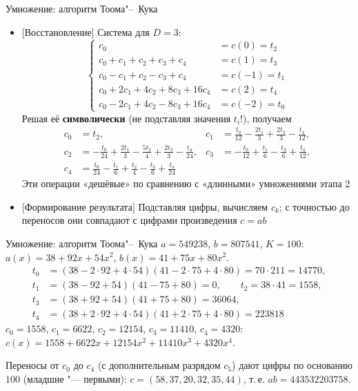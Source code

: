 \documentclass{ca-slides}
\begin{document}
\begin{canvasframe}[shrink=38]{Умножение: алгоритм Тоома"--~Кука}
  \small
  \begin{itemize}
    \item {[Восстановление]} Система для $D = 3$:
      \[\left\{\begin{aligned}
        c_0 &= c(0) = t_2\\
        c_0 + c_1 + c_2 + c_3 + c_4 &= c(1) = t_3\\
        c_0 - c_1 + c_2 - c_3 + c_4 &= c(-1) = t_1\\
        c_0 + 2c_1 + 4c_2 + 8c_3 + 16c_4 &= c(2) = t_4\\
        c_0 - 2c_1 + 4c_2 - 8c_3 + 16c_4 &= c(-2) = t_0
      \end{aligned}\right.\]
      Решая её \textbf{символически} (не подставляя значения $t_i$!), получаем
      \[\begin{aligned}
        c_0 &= t_2, & c_1 &= \tfrac{t_0}{12} - \tfrac{2t_1}{3} + \tfrac{2t_3}{3} - \tfrac{t_4}{12},\\
        c_2 &= -\tfrac{t_0}{24} + \tfrac{2t_1}{3} - \tfrac{5t_2}{4} + \tfrac{2t_3}{3} - \tfrac{t_4}{24}, &
        c_3 &= -\tfrac{t_0}{12} + \tfrac{t_1}{6} - \tfrac{t_3}{6} + \tfrac{t_4}{12},\\
        c_4 &= \tfrac{t_0}{24} - \tfrac{t_1}{6} + \tfrac{t_2}{4} - \tfrac{t_3}{6} + \tfrac{t_4}{24}
      \end{aligned}\]
      Эти операции «дешёвые» по сравнению с «длинными» умножениями этапа 2
    \item {[Формирование результата]} Подставляя цифры, вычисляем $c_k$; с точностью до
      переносов они совпадают с цифрами произведения $c = ab$
  \end{itemize}
\end{canvasframe}

\begin{canvasframe}[shrink=6]{Умножение: алгоритм Тоома"--~Кука}
  \small
  $a = 549238$, $b = 807541$, $K = 100$:\quad $a(x) = 38 + 92x + 54x^2$, $b(x) = 41 + 75x + 80x^2$.
  \[\begin{aligned}
    t_0 &= (38 - 2 \cdot 92 + 4 \cdot 54)(41 - 2 \cdot 75 + 4 \cdot 80) = 70 \cdot 211 = 14770,\\
    t_1 &= (38 - 92 + 54)(41 - 75 + 80) = 0, \qquad t_2 = 38 \cdot 41 = 1558,\\
    t_3 &= (38 + 92 + 54)(41 + 75 + 80) = 36064,\\
    t_4 &= (38 + 2 \cdot 92 + 4 \cdot 54)(41 + 2 \cdot 75 + 4 \cdot 80) = 223818
  \end{aligned}\]
  $c_0 = 1558$, $c_1 = 6622$, $c_2 = 12154$, $c_3 = 11410$, $c_4 = 4320$:\quad
  $c(x) = 1558 + 6622x + 12154x^2 + 11410x^3 + 4320x^4$.

  Переносы от $c_0$ до $c_4$ (с дополнительным разрядом $c_5$) дают цифры по основанию $100$
  (младшие "--- первыми): $c = (58, 37, 20, 32, 35, 44)$, т.\,е. $ab = 443532203758$.
\end{canvasframe}
\end{document}
